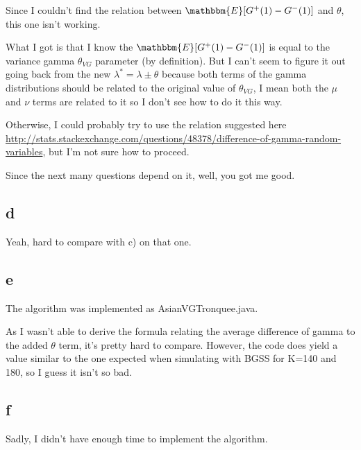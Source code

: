 \documentclass[12pt]{report}
\begin{document}
Since I couldn't find the relation between $\mathbbm{E}[G^+(1) - G^-(1)]$ and $\theta$, this one isn't working.

What I got is that I know the $\mathbbm{E}[G^+(1) - G^-(1)]$ is equal to the variance gamma $\theta_{VG}$ parameter (by definition). But I can't seem to figure it out going back from the new $\lambda^* = \lambda \pm \theta$ because both terms of the gamma distributions should be related to the original value of $\theta_{VG}$, I mean both the $\mu$ and $\nu$ terms are related to it so I don't see how to do it this way.

Otherwise, I could probably try to use the relation suggested here \url{http://stats.stackexchange.com/questions/48378/difference-of-gamma-random-variables}, but I'm not sure how to proceed.

Since the next many questions depend on it, well, you got me good.

\subsection*{d}

Yeah, hard to compare with c) on that one.

\subsection*{e}

The algorithm was implemented as AsianVGTronquee.java.

As I wasn't able to derive the formula relating the average difference of gamma to the added $\theta$ term, it's pretty hard to compare. However, the code does yield a value similar to the one expected when simulating with BGSS for K=140 and 180, so I guess it isn't so bad.


\subsection*{f}

Sadly, I didn't have enough time to implement the algorithm.





\end{document}
